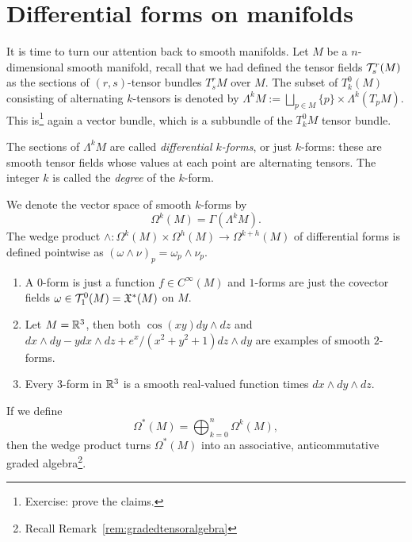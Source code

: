 \section{Differential forms on manifolds}

It is time to turn our attention back to smooth manifolds.
Let $M$ be a $n$-dimensional smooth manifold, recall that we had defined the tensor fields $\mathcal{T}_s^r(M)$ as the sections of $(r,s)$-tensor bundles $T_s^rM$ over $M$.
The subset of $T_k^0(M)$ consisting of alternating $k$-tensors is denoted by $\Lambda^kM:= \bigsqcup_{p\in M} \{p\}\times \Lambda^k(T_p M)$. This is\footnote{Exercise: prove the claims.} again a vector bundle, which is a subbundle of the $T_k^0 M$ tensor bundle.
\begin{definition}
	The sections of $\Lambda^kM$ are called \emph{differential $k$-forms}, or just $k$-forms: these are smooth tensor fields whose values at each point are alternating tensors. The integer $k$ is called the \emph{degree} of the $k$-form.

	We denote the vector space of smooth $k$-forms by
	\begin{equation}
		\Omega^k(M) = \Gamma(\Lambda^kM).
	\end{equation}
	The wedge product $\wedge:\Omega^k(M)\times\Omega^h(M)\to \Omega^{k+h}(M)$ of differential forms is defined pointwise as ${(\omega\wedge\nu)}_p = \omega_p\wedge\nu_p$.
\end{definition}

\begin{example}
	\begin{enumerate}
		\item A $0$-form is just a function $f\in C^\infty(M)$ and $1$-forms are just the covector fields $\omega\in\mathcal{T}_1^0(M) = \mathfrak{X}^*(M)$ on $M$.
		\item Let $M=\mathbb{R}^3$, then both $\cos(xy)dy\wedge dz$ and $dx\wedge dy - y dx\wedge dz + e^x/(x^2+y^2+1) dz\wedge dy$ are examples of smooth $2$-forms.
		\item Every $3$-form in $\mathbb{R}^3$ is a smooth real-valued function times $dx\wedge dy\wedge dz$.
	\end{enumerate}
\end{example}

\begin{remark}
	If we define
	\begin{equation}
		\Omega^*(M) = \bigoplus_{k=0}^n \Omega^k(M),
	\end{equation}
	then the wedge product turns $\Omega^*(M)$ into an associative, anticommutative graded algebra\footnote{Recall Remark~\ref{rem:gradedtensoralgebra}}.
\end{remark}

